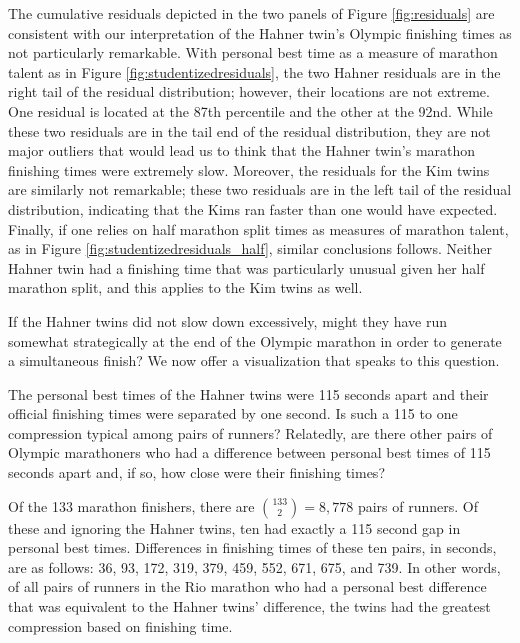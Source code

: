\documentclass[12pt,titlepage]{article}
\begin{document}
The cumulative residuals depicted in the two panels of Figure
\ref{fig:residuals} are consistent with our interpretation of the
Hahner twin's Olympic finishing times as not particularly
remarkable. With personal best time as a measure of marathon talent as
in Figure \ref{fig:studentizedresiduals}, the two Hahner residuals are
in the right tail of the residual distribution; however, their
locations are not extreme.  One residual is located at the 87th
percentile and the other at the 92nd.  While these two residuals are
in the tail end of the residual distribution, they are not major
outliers that would lead us to think that the Hahner twin's marathon
finishing times were extremely slow.  Moreover, the residuals for the
Kim twins are similarly not remarkable; these two residuals are in the
left tail of the residual distribution, indicating that the Kims ran
faster than one would have expected.  Finally, if one relies on half
marathon split times as measures of marathon talent, as in Figure
\ref{fig:studentizedresiduals_half}, similar conclusions follows.
Neither Hahner twin had a finishing time that was particularly unusual
given her half marathon split, and this applies to the Kim twins as
well.

If the Hahner twins did not slow down excessively, might they have run
somewhat strategically at the end of the Olympic marathon in order to
generate a simultaneous finish?  We now offer a visualization that
speaks to this question.

The personal best times of the Hahner twins were 115 seconds apart and
their official finishing times were separated by one second.  Is such
a 115 to one compression typical among pairs of runners?  Relatedly,
are there other pairs of Olympic marathoners who had a difference
between personal best times of 115 seconds apart and, if so, how close
were their finishing times?

Of the 133 marathon finishers, there are $\binom{133}{2} = 8,778$
pairs of runners.  Of these and ignoring the Hahner twins, ten had
exactly a 115 second gap in personal best times.  Differences in
finishing times of these ten pairs, in seconds, are as follows: 36,
93, 172, 319, 379, 459, 552, 671, 675, and 739.  In other words, of
all pairs of runners in the Rio marathon who had a personal best
difference that was equivalent to the Hahner twins' difference, the
twins had the greatest compression based on finishing time.
\end{document}
